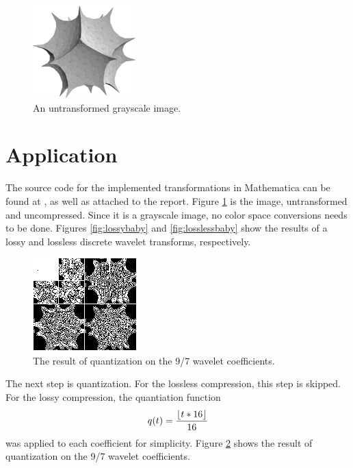 \documentclass[titlepage,12pt]{article}
\DeclarePairedDelimiter\floor{\lfloor}{\rfloor}
\begin{document}
\begin{figure}
	\centering
	\includegraphics{resources/baby.png}
	\caption{An untransformed grayscale image.}
	\label{fig:original}
\end{figure}


\section{Application}

The source code for the implemented transformations in Mathematica can be found at \cite{implement},
as well as attached to the report.
Figure \ref{fig:original} is the image, untransformed and uncompressed.
Since it is a grayscale image, no color space conversions needs to be done.
Figures \ref{fig:lossybaby} and \ref{fig:losslessbaby} show the results of a lossy and lossless 
discrete wavelet transforms, respectively.

\begin{figure}
	\centering
	\includegraphics{resources/quantBabyPlot.png}
	\caption{The result of quantization on the 9/7 wavelet coefficients.}
	\label{fig:quantBabyPlot}
\end{figure}

The next step is quantization.
For the lossless compression, this step is skipped.
For the lossy compression, the quantiation function
\[q(t)=\frac{\floor{t*16}}{16}\]
was applied to each coefficient for simplicity.
Figure \ref{fig:quantBabyPlot} shows the result of quantization on the 9/7 wavelet coefficients.
\end{document}
